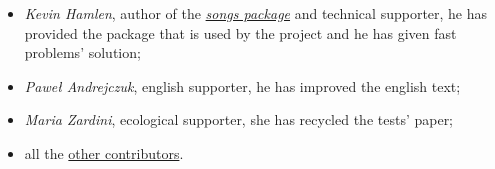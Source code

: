 \begin{itemize}
	\item {\textit{\rmfamily Kevin Hamlen}}, author of the \href{http://songs.sourceforge.net/}{\textit{songs package}} and technical supporter, he has provided the package that is used by the project and he has given fast problems' solution;
	\item {\textit{\rmfamily Paweł Andrejczuk}}, english supporter, he has improved the english text;
	\item {\textit{\rmfamily Maria Zardini}}, ecological supporter, she has recycled the tests' paper;
  \item all the \href{https://github.com/PietroPrandini/GuitarHub/graphs/contributors}{other contributors}.
\end{itemize}
